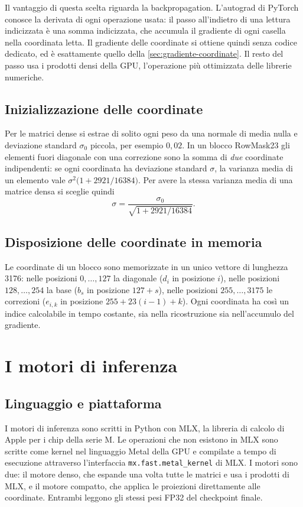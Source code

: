 Il vantaggio di questa scelta riguarda la backpropagation. L'autograd di PyTorch conosce la derivata di ogni operazione usata: il passo all'indietro di una lettura indicizzata è una somma indicizzata, che accumula il gradiente di ogni casella nella coordinata letta. Il gradiente delle coordinate si ottiene quindi senza codice dedicato, ed è esattamente quello della \autoref{sec:gradiente-coordinate}. Il resto del passo usa i prodotti densi della GPU, l'operazione più ottimizzata delle librerie numeriche.

\subsection{Inizializzazione delle coordinate}
\label{sec:init-coordinate}
Per le matrici dense si estrae di solito ogni peso da una normale di media nulla e deviazione standard $\sigma_0$ piccola, per esempio $0{,}02$. In un blocco RowMask23 gli elementi fuori diagonale con una correzione sono la somma di \emph{due} coordinate indipendenti: se ogni coordinata ha deviazione standard $\sigma$, la varianza media di un elemento vale $\sigma^2\big(1 + \num{2921}/\num{16384}\big)$. Per avere la stessa varianza media di una matrice densa si sceglie quindi
\begin{equation}
\sigma = \frac{\sigma_0}{\sqrt{1+\num{2921}/\num{16384}}}.
\end{equation}


\subsection{Disposizione delle coordinate in memoria}
\label{sec:layout-coordinate}
Le coordinate di un blocco sono memorizzate in un unico vettore di lunghezza \num{3176}: nelle posizioni $0,\dots,127$ la diagonale ($d_i$ in posizione $i$), nelle posizioni $128,\dots,254$ la base ($b_s$ in posizione $127+s$), nelle posizioni $255,\dots,3175$ le correzioni ($e_{i,k}$ in posizione $255+23(i-1)+k$). Ogni coordinata ha così un indice calcolabile in tempo costante, sia nella ricostruzione sia nell'accumulo del gradiente.


\section{I motori di inferenza}
\label{sec:motori-inferenza}

\subsection{Linguaggio e piattaforma}
I motori di inferenza sono scritti in Python con MLX, la libreria di calcolo di Apple per i chip della serie M. Le operazioni che non esistono in MLX sono scritte come kernel nel linguaggio Metal della GPU e compilate a tempo di esecuzione attraverso l'interfaccia \texttt{mx.fast.metal\_kernel} di MLX. I motori sono due: il motore denso, che espande una volta tutte le matrici e usa i prodotti di MLX, e il motore compatto, che applica le proiezioni direttamente alle coordinate. Entrambi leggono gli stessi pesi FP32 del checkpoint finale.

